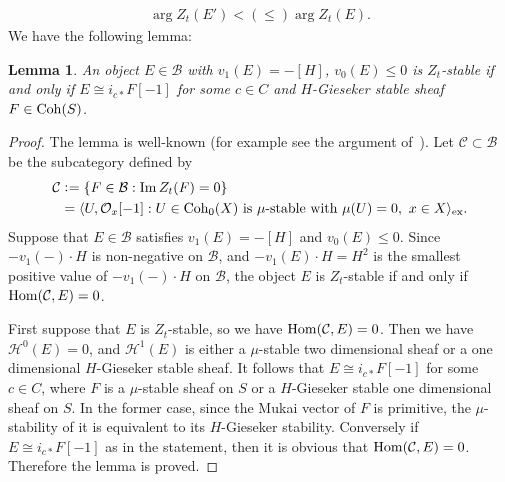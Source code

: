 \documentclass[11pt]{amsart}
\theoremstyle{plain}
\newtheorem{lem}[thm]{Lemma}
\newcommand{\bB}{\mathcal{B}}
\newcommand{\cC}{\mathcal{C}}
\newcommand{\hH}{\mathcal{H}}
\newcommand{\oO}{\mathcal{O}}
\newcommand{\Hom}{\mathop{\rm Hom}\nolimits}
\newcommand{\Coh}{\mathop{\rm Coh}\nolimits}
\newcommand{\Imm}{\mathop{\rm Im}\nolimits}
\begin{document}
\begin{align*}
\arg Z_t(E') <(\le) \arg Z_t(E). 
\end{align*}
We have the following lemma: 
\begin{lem}\label{lem:tilting}
An object $E \in \bB$ with 
$v_1(E)=-[H]$, 
$v_0(E) \le 0$ is 
$Z_t$-stable if and only if 
$E\cong i_{c\ast}F[-1]$
for some $c \in C$ and 
$H$-Gieseker stable sheaf $F \in \Coh(S)$.
\end{lem}
\begin{proof}
The lemma is well-known (for example see 
the argument of~\cite[Lemma~6.1]{BayBrill}). 
Let $\cC \subset \bB$ be the subcategory defined by
\begin{align*}
\cC &\cneq \{ F \in \bB : \Imm Z_t(F)=0\} \\
&=\langle U, \oO_x[-1] : 
U \in \Coh_0(X) \mbox{ is } \mu\mbox{-stable with }\mu(U)=0, \ 
x \in X \rangle_{\rm{ex}}.
\end{align*}
Suppose that $E \in \bB$ satisfies 
$v_1(E)=-[H]$
and $v_0(E)\le 0$. 
Since $-v_1(-) \cdot H$
is non-negative on $\bB$, and
 $-v_1(E) \cdot H =H^2$ is the
smallest positive value of $-v_1(-) \cdot H$ on $\bB$, 
the object $E$ 
is $Z_t$-stable if and only if 
$\Hom(\cC, E)=0$. 

First suppose that 
$E$ is $Z_t$-stable, 
so we have $\Hom(\cC, E)=0$.
Then we have 
$\hH^0(E)=0$, and 
 $\hH^1(E)$ is either a $\mu$-stable two 
dimensional sheaf 
or a one dimensional $H$-Gieseker stable sheaf. 
It follows that $E \cong i_{c\ast}F[-1]$
for some $c \in C$, where $F$ is a $\mu$-stable sheaf 
on $S$ or a $H$-Gieseker stable one dimensional sheaf on $S$. 
In the former case, since the Mukai vector of $F$ is primitive, 
the $\mu$-stability of it is equivalent 
to its $H$-Gieseker stability. 
Conversely if $E \cong i_{c\ast}F[-1]$
as in the statement, then 
it is obvious that $\Hom(\cC, E)=0$. 
Therefore the lemma is proved. 
\end{proof}
\end{document}
